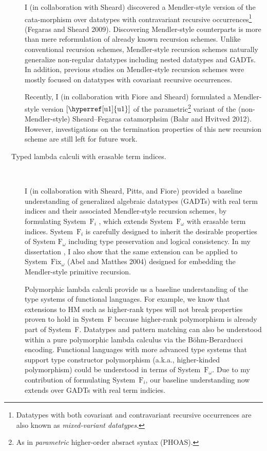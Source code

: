 \documentclass[11pt,letterpaper]{article}
\begin{document}
\begin{description}
\hspace*{1ex}
I (in collaboration with Sheard) discovered a Mendler-style version
\cite{Ahn11} of the cata-morphism over datatypes
with contravariant recursive occurrences\footnote{ Datatypes with both
	covariant and contravariant recursive occurrences are also known as
	\emph{mixed-variant datatypes}. } (Fegaras and Sheard 2009).
Discovering Mendler-style counterparts is more than
mere reformulation of already known recursion schemes.
Unlike conventional recursion schemes, Mendler-style recursion schemes
naturally generalize non-regular datatypes including nested datatypes and
GADTs. In addition, previous studies on Mendler-style recursion schemes
were mostly focused on datatypes with covariant recursive occurrences.

\hspace*{1ex}
Recently, I (in collaboration with Fiore and Sheard)
formulated a Mendler-style version $[\text{\hyperref[u1]{u1}}]$ of
the parametric\footnote{
	As in \emph{parametric} higher-order absract syntax (PHOAS).}
variant of the (non-Mendler-style) Sheard--Fegaras catamorphsim
(Bahr and Hvitved 2012).
However, investigations on the termination properties of
this new recursion scheme are still left for future work.

\item[~~Typed lambda calculi with erasable term indices.]~

\hspace*{1ex}
I (in collaboration with Sheard, Pitts, and Fiore) provided
a baseline understanding of generalized algebraic datatypes (GADTs) with
real term indices and their associated Mendler-style recursion schemes,
by formulating System~$\mathrm{F}_i$ \cite{AhnSheFioPit13}, which extends
System~$\textrm{F}_\omega$ with erasable term indices. System~$\mathrm{F}_i$
is carefully designed to inherit the desirable properties of
System $\mathrm{F}_\omega$ including type preservation and logical consistency.
In my dissertation \cite{AhnPhdThesis14}, I also show that the same extension
can be applied to System~$\mathrm{Fix}_\omega$ (Abel and Matthes 2004)
designed for embedding the Mendler-style primitive recursion.

\hspace*{1ex}
Polymorphic lambda calculi provide us a baseline understanding of
the type systems of functional languages. For example, we know that
extensions to HM such as higher-rank types will not break properties
proven to hold in System~F because higher-rank polymorphism is already
part of System~F. Datatypes and pattern matching can also be understood
within a pure polymorphic lambda calculus via the B\"ohm-Berarducci encoding.
Functional languages with more advanced type systems that support
type constructor polymorphism (a.k.a., higher-kinded polymorphism) could
be understood in terms of System~$\textrm{F}_\omega$.
Due to my contribution of formulating System~$\mathrm{F}_i$,
our baseline understanding now extends over GADTs with real term indicies.


\end{description}
\end{document}
